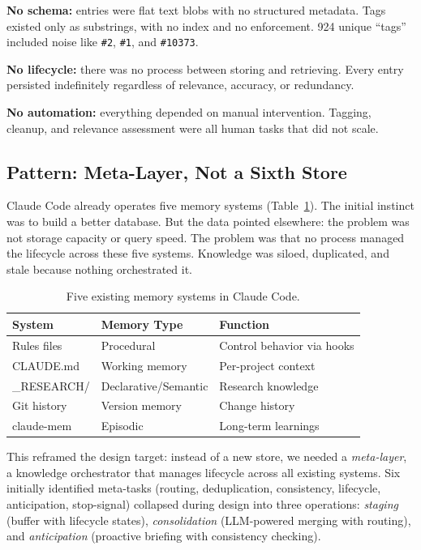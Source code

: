 \documentclass[11pt,a4paper]{article}
\begin{document}
\textbf{No schema:} entries were flat text blobs with no structured metadata.
Tags existed only as substrings, with no index and no enforcement.
924 unique ``tags'' included noise like \texttt{\#2}, \texttt{\#1}, and \texttt{\#10373}.

\textbf{No lifecycle:} there was no process between storing and retrieving.
Every entry persisted indefinitely regardless of relevance, accuracy, or redundancy.

\textbf{No automation:} everything depended on manual intervention.
Tagging, cleanup, and relevance assessment were all human tasks that did not scale.


\subsection{Pattern: Meta-Layer, Not a Sixth Store}

Claude Code already operates five memory systems (Table~\ref{tab:five-systems}).
The initial instinct was to build a better database.
But the data pointed elsewhere: the problem was not storage capacity or query speed.
The problem was that no process managed the lifecycle across these five systems.
Knowledge was siloed, duplicated, and stale because nothing orchestrated it.

\begin{table}[h]
\centering
\caption{Five existing memory systems in Claude Code.}
\label{tab:five-systems}
\small
\begin{tabular}{lll}
\toprule
\textbf{System} & \textbf{Memory Type} & \textbf{Function} \\
\midrule
Rules files & Procedural & Control behavior via hooks \\
CLAUDE.md & Working memory & Per-project context \\
\_RESEARCH/ & Declarative/Semantic & Research knowledge \\
Git history & Version memory & Change history \\
claude-mem & Episodic & Long-term learnings \\
\bottomrule
\end{tabular}
\end{table}

This reframed the design target: instead of a new store, we needed a \emph{meta-layer}, a knowledge orchestrator that manages lifecycle across all existing systems.
Six initially identified meta-tasks (routing, deduplication, consistency, lifecycle, anticipation, stop-signal) collapsed during design into three operations: \emph{staging} (buffer with lifecycle states), \emph{consolidation} (LLM-powered merging with routing), and \emph{anticipation} (proactive briefing with consistency checking).
\end{document}
